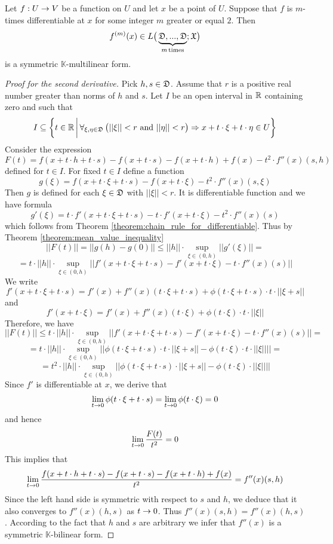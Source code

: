 \begin{theorem}\label{theorem:higher_order_derivatives_are_symmetric}
Let $f:U\rightarrow V$ be a function on $U$ and let $x$ be a point of $U$. Suppose that $f$ is $m$-times differentiable at $x$ for some integer $m$ greater or equal $2$. Then 
$$f^{(m)}(x) \in L\big(\underbrace{{\mathfrak D},...,{\mathfrak D}}_{m\,\mathrm{times}};{\mathfrak X}\big)$$
is a symmetric $\mathbb{K}$-multilinear form.
\end{theorem}
\begin{proof}[Proof for the second derivative]
Pick $h,s\in {\mathfrak D}$. Assume that $r$ is a positive real number greater than norms of $h$ and $s$. Let $I$ be an open interval in ${\mathbb R}$ containing zero and such that
$$I \subseteq \bigg\{t\in {\mathbb R}\,\bigg|\,\forall_{\xi,\eta\in {\mathfrak D}}\,\big(||\xi|| < r\mbox{ and }||\eta|| < r\big)\Rightarrow x + t\cdot \xi + t\cdot \eta \in U\bigg\}$$
Consider the expression
$$F(t) = f(x + t\cdot h + t\cdot s) - f(x + t\cdot s) - f(x + t\cdot h) + f(x) - t^2 \cdot f''(x)(s,h)$$
defined for $t \in I$. For fixed $t\in I$ define a function 
$$g(\xi) = f(x + t\cdot \xi + t\cdot s) - f(x + t\cdot \xi) - t^2 \cdot f''(x)(s,\xi)$$
Then $g$ is defined for each $\xi\in {\mathfrak D}$ with $||\xi||< r$. It is differentiable function and we have formula
$$g'(\xi) = t\cdot f'(x + t\cdot \xi + t\cdot s) - t\cdot f'(x + t\cdot \xi) - t^2\cdot f''(x)(s)$$
which follows from Theorem \ref{theorem:chain_rule_for_differentiable}. Thus by Theorem \ref{theorem:mean_value_inequality}
$$||F(t)|| = ||g(h) - g(0)|| \leq ||h||\cdot \sup_{\xi \in (0,h)}||g'(\xi)|| =$$
$$= t\cdot ||h||\cdot \sup_{\xi\in (0,h)}||f'(x + t\cdot \xi + t\cdot s) - f'(x + t\cdot \xi) - t\cdot f''(x)(s)||$$
We write
$$f'(x + t\cdot \xi + t\cdot s) = f'(x) + f''(x)(t\cdot \xi + t\cdot s) + \phi(t\cdot \xi + t\cdot s) \cdot t\cdot || \xi + s||$$
and
$$f'(x + t\cdot \xi) = f'(x) + f''(x)(t\cdot \xi) + \phi(t\cdot \xi) \cdot t\cdot ||\xi||$$
Therefore, we have
$$||F(t)|| \leq t\cdot ||h||\cdot \sup_{\xi \in (0,h)}||f'(x + t\cdot \xi + t\cdot s) - f'(x + t\cdot \xi) - t\cdot f''(x)(s)|| =$$
$$= t\cdot ||h||\cdot \sup_{\xi \in (0,h)}\big|\big|\phi(t\cdot \xi + t\cdot s) \cdot t\cdot || \xi + s|| - \phi(t\cdot \xi) \cdot t\cdot ||\xi||\big|\big| = $$
$$=t^2\cdot ||h||\cdot \sup_{\xi \in (0,h)}\big|\big|\phi(t\cdot \xi + t\cdot s)\cdot || \xi + s|| - \phi(t\cdot \xi) \cdot ||\xi||\big|\big|$$
Since $f'$ is differentiable at $x$, we derive that 
$$\lim_{t\rightarrow 0}\phi(t\cdot \xi + t\cdot s) = \lim_{t\rightarrow 0}\phi(t\cdot \xi) = 0$$
and hence 
$$\lim_{t\rightarrow 0}\frac{F(t)}{t^2} = 0$$
This implies that
$$\lim_{t\rightarrow 0}\frac{f(x + t\cdot h + t\cdot s) - f(x + t\cdot s) - f(x + t\cdot h) + f(x)}{t^2} = f''(x)(s,h)$$
Since the left hand side is symmetric with respect to $s$ and $h$, we deduce that it also converges to $f''(x)(h,s)$ as $t \rightarrow 0$. Thus $f''(x)(s,h) = f''(x)(h,s)$. According to the fact that $h$ and $s$ are arbitrary we infer that $f''(x)$ is a symmetric $\mathbb{K}$-bilinear form.
\end{proof}

